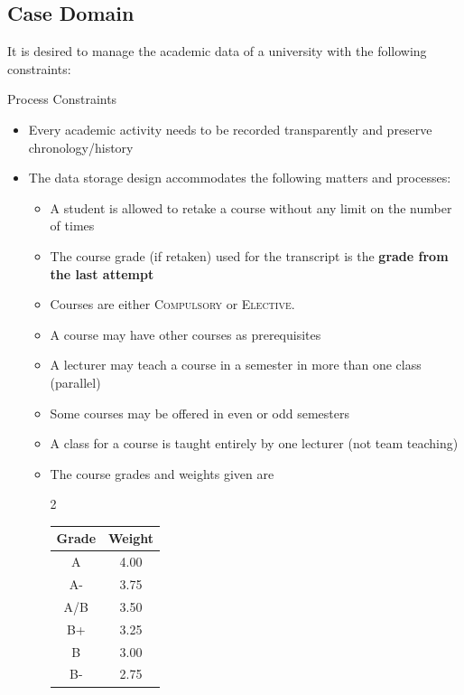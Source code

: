\subsection{Case Domain}
It is desired to manage the academic data of a university with the following constraints:
\begin{infobox}{Process Constraints}
    \begin{itemize}
        \itemsep0em
     \item Every academic activity needs to be recorded transparently and preserve chronology/history
     \item The data storage design accommodates the following matters and processes:
     \begin{itemize}
         \itemsep0em \small
         \item A student is allowed to retake a course without any limit on the number of times
         \item The course grade (if retaken) used for the transcript is the \textbf{grade from the last attempt}
         \item Courses are either \textsc{Compulsory} or \textsc{Elective}.
         \item A course may have other courses as prerequisites
          \item A lecturer may teach a course in a semester in more than one class (parallel)
         \item Some courses may be offered in even or odd semesters
         \item A class for a course is taught entirely by one lecturer (not team teaching)
         \item The course grades and weights given are
         \begin{center}
         \begin{multicols}{2}
            \begin{tabular}{c|c}
             Grade & Weight \\ \hline
           A   & 4.00 \\
            A-  & 3.75 \\
            A/B & 3.50 \\
            B+ & 3.25 \\
            B & 3.00 \\ 
            B-  & 2.75 \\
         \end{tabular}  
         \columnbreak
         \begin{tabular}{c|c}

\end{tabular}
\end{multicols}
\end{center}
\end{itemize}
\end{itemize}
\end{infobox}
